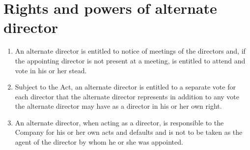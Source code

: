 \section{Rights and powers of alternate director}

\begin{enumerate}[label=(\alph*)]
    \item An alternate director is entitled to notice of meetings of the directors and, if the appointing director is not present at a meeting, is entitled to attend and vote in his or her stead.
    
    \item Subject to the Act, an alternate director is entitled to a separate vote for each director that the alternate director represents in addition to any vote the alternate director may have as a director in his or her own right.
    
    \item An alternate director, when acting as a director, is responsible to the Company for his or her own acts and defaults and is not to be taken as the agent of the director by whom he or she was appointed.
\end{enumerate} 
